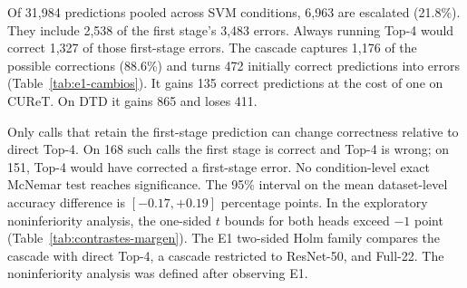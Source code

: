 \documentclass[10pt,a4paper,fleqn]{article}
\begin{document}
Of 31,984 predictions pooled across SVM conditions, 6,963 are escalated (21.8\%). They include 2,538 of the first stage's 3,483 errors. Always running Top-4 would correct 1,327 of those first-stage errors. The cascade captures 1,176 of the possible corrections (88.6\%) and turns 472 initially correct predictions into errors (Table~\ref{tab:e1-cambios}). It gains 135 correct predictions at the cost of one on CUReT. On DTD it gains 865 and loses 411.

Only calls that retain the first-stage prediction can change correctness relative to direct Top-4. On 168 such calls the first stage is correct and Top-4 is wrong; on 151, Top-4 would have corrected a first-stage error. No condition-level exact McNemar test reaches significance. The 95\% interval on the mean dataset-level accuracy difference is $[-0.17,+0.19]$ percentage points. In the exploratory noninferiority analysis, the one-sided $t$ bounds for both heads exceed $-1$ point (Table~\ref{tab:contrastes-margen}). The E1 two-sided Holm family compares the cascade with direct Top-4, a cascade restricted to ResNet-50, and Full-22. The noninferiority analysis was defined after observing E1.
\end{document}
